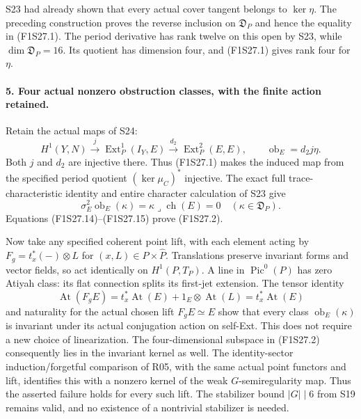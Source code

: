 S23 had already shown that every actual cover tangent
belongs to $\ker\eta$. The preceding construction proves
the reverse inclusion on $\mathfrak D_P$ and hence
the equality in (F1S27.1). The period derivative has
rank twelve on this open by S23, while
$\dim\mathfrak D_P=16$. Its quotient has dimension four,
and (F1S27.1) gives rank four for $\eta$.

\paragraph{5. Four actual nonzero obstruction classes, with the finite action retained.}
Retain the actual maps of S24:
\[
 H^1(Y,N)\xrightarrow{j}\operatorname{Ext}^1_P(I_Y,E)
       \xrightarrow{d_2}\operatorname{Ext}^2_P(E,E),
       \qquad \operatorname{ob}_E=d_2j\eta.
 \tag{F1S27.14}
\]
Both $j$ and $d_2$ are injective there. Thus (F1S27.1)
makes the induced map from the specified period quotient
$(\ker\mu_C)^*$ injective. The exact full
trace-characteristic identity and entire character
calculation of S23 give
\[
              \sigma_E^2\operatorname{ob}_E(\kappa)
                       =\kappa\mathbin{\lrcorner}\operatorname{ch}(E)=0
                     \quad(\kappa\in\mathfrak D_P).
 \tag{F1S27.15}
\]
Equations (F1S27.14)--(F1S27.15) prove (F1S27.2).

Now take any specified coherent point lift, with each
element acting by $F_g=t_x^*(-)\otimes L$ for
$(x,L)\in P\times\widehat P$.
Translations preserve invariant forms and vector fields,
so act identically on $H^1(P,T_P)$. A line in
$\operatorname{Pic}^0(P)$ has zero Atiyah class: its
flat connection splits its first-jet extension.
The tensor identity
\[
 \operatorname{At}(F_gE)=t_x^*\operatorname{At}(E)
                    +1_E\otimes\operatorname{At}(L)
                       =t_x^*\operatorname{At}(E)
 \tag{F1S27.16}
\]
and naturality for the actual chosen lift
$F_gE\simeq E$ show that every class
$\operatorname{ob}_E(\kappa)$ is invariant under its
actual conjugation action on self-Ext.
This does not require a new choice of linearization.
The four-dimensional subspace in (F1S27.2) consequently
lies in the invariant kernel as well.
The identity-sector induction/forgetful comparison of
R05, with the same actual point functors and lift,
identifies this with a nonzero kernel of the weak
$G$-semiregularity map. Thus the asserted failure holds
for every such lift. The stabilizer bound $|G|\mid6$
from S19 remains valid, and no existence of a nontrivial
stabilizer is needed.

